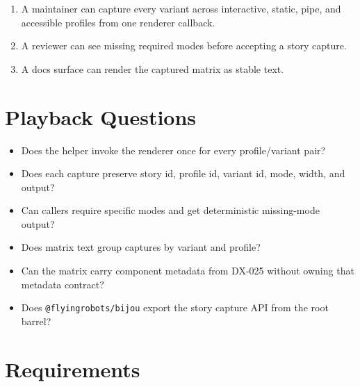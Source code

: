 \begin{enumerate}
\def\labelenumi{\arabic{enumi}.}
\tightlist
\item
  A maintainer can capture every variant across interactive, static, pipe, and accessible profiles from one renderer callback.
\item
  A reviewer can see missing required modes before accepting a story capture.
\item
  A docs surface can render the captured matrix as stable text.
\end{enumerate}

\section{Playback Questions}\label{record-089-playback-questions}

\begin{itemize}
\tightlist
\item
  Does the helper invoke the renderer once for every profile/variant pair?
\item
  Does each capture preserve story id, profile id, variant id, mode, width, and output?
\item
  Can callers require specific modes and get deterministic missing-mode output?
\item
  Does matrix text group captures by variant and profile?
\item
  Can the matrix carry component metadata from DX-025 without owning that metadata contract?
\item
  Does \texttt{@\allowbreak{}f\allowbreak{}l\allowbreak{}y\allowbreak{}i\allowbreak{}n\allowbreak{}g\allowbreak{}r\allowbreak{}o\allowbreak{}b\allowbreak{}o\allowbreak{}t\allowbreak{}s\allowbreak{}/\allowbreak{}b\allowbreak{}i\allowbreak{}j\allowbreak{}o\allowbreak{}u} export the story capture API from the root barrel?
\end{itemize}

\section{Requirements}\label{record-089-requirements}

